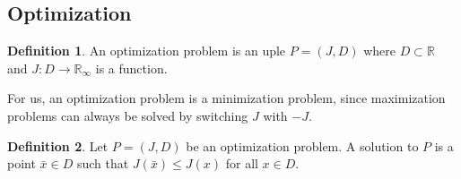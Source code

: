 \documentclass[]{article}
\theoremstyle{definition}
\newtheorem{definition}{Definition}[section]
\theoremstyle{definition}
\newcommand{\raw}{\rightarrow}
\newcommand{\bb}{\mathbb}
\begin{document}
		\subsection{Optimization}
		
		
		\begin{definition}
			An optimization problem is an uple $P = ( J, D )$ where $D \subset \bb{R}$ and $J: D \raw \bb{R}_\infty $ is a function.  
		\end{definition}	

		For us, an optimization problem is a minimization problem, since maximization problems can always be solved by switching $J$ with $-J$.
	
		\begin{definition}
			Let $P = (J, D)$ be an optimization problem. A solution to $P$ is a point $\bar{x} \in D$ such that $J(\bar{x}) \leq J(x)$ for all $x \in D$.
		\end{definition}
	
		
	
	
\end{document}
